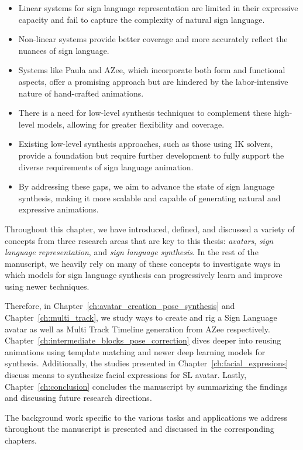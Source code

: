 \documentclass[../../main.tex]{subfiles}
\begin{document}
\begin{itemize} 
  \item Linear systems for sign language representation are limited in their expressive capacity and fail to capture the complexity of natural sign language.
  \item Non-linear systems provide better coverage and more accurately reflect the nuances of sign language.
  \item Systems like Paula and AZee, which incorporate both form and functional aspects, offer a promising approach but are hindered by the labor-intensive nature of hand-crafted animations.
  \item There is a need for low-level synthesis techniques to complement these high-level models, allowing for greater flexibility and coverage.
  \item Existing low-level synthesis approaches, such as those using IK solvers, provide a foundation but require further development to fully support the diverse requirements of sign language animation.
  \item By addressing these gaps, we aim to advance the state of sign language synthesis, making it more scalable and capable of generating natural and expressive animations.
\end{itemize}

Throughout this chapter, we have introduced, defined, and discussed a variety of concepts from three research areas that are key to this thesis: \textit{avatars}, \textit{sign language representation}, and \textit{sign language synthesis}. In the rest of the manuscript, we heavily rely on many of these concepts to investigate ways in which models for sign language synthesis can progressively learn and improve using newer techniques.

Therefore, in Chapter~\ref{ch:avatar_creation_pose_synthesis} and Chapter~\ref{ch:multi_track}, we study ways to create and rig a Sign Language avatar as well as Multi Track Timeline generation from AZee respectively. Chapter~\ref{ch:intermediate_blocks_pose_correction} dives deeper into reusing animations using template matching and newer deep learning models for synthesis. Additionally, the studies presented in Chapter~\ref{ch:facial_expresions} discuss means to synthesize facial expressions for SL avatar. Lastly, Chapter~\ref{ch:conclusion} concludes the manuscript by summarizing the findings and discussing future research directions.

The background work specific to the various tasks and applications we address throughout the manuscript is presented and discussed in the corresponding chapters.
\end{document}
